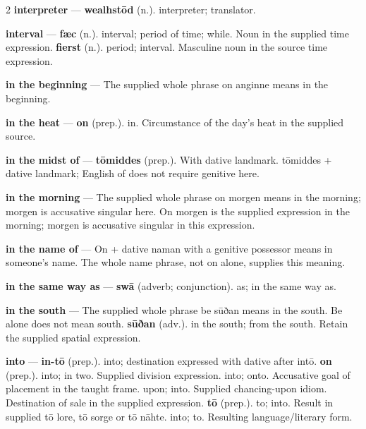 \begin{multicols}{2}
\textbf{interpreter} — \textbf{wealhstōd} (n.). interpreter; translator.\par
\textbf{interval} — \textbf{fæc} (n.). interval; period of time; while. Noun in the supplied time expression. \textbf{fierst} (n.). period; interval. Masculine noun in the source time expression.\par
\textbf{in the beginning} — The supplied whole phrase on anginne means in the beginning.\par
\textbf{in the heat} — \textbf{on} (prep.). in. Circumstance of the day's heat in the supplied source.\par
\textbf{in the midst of} — \textbf{tōmiddes} (prep.). With dative landmark. tōmiddes + dative landmark; English of does not require genitive here.\par
\textbf{in the morning} — The supplied whole phrase on morgen means in the morning; morgen is accusative singular here. On morgen is the supplied expression in the morning; morgen is accusative singular in this expression.\par
\textbf{in the name of} — On + dative naman with a genitive possessor means in someone’s name. The whole name phrase, not on alone, supplies this meaning.\par
\textbf{in the same way as} — \textbf{swā} (adverb; conjunction). as; in the same way as.\par
\textbf{in the south} — The supplied whole phrase be sūðan means in the south. Be alone does not mean south. \textbf{sūðan} (adv.). in the south; from the south. Retain the supplied spatial expression.\par
\textbf{into} — \textbf{in-tō} (prep.). into; destination expressed with dative after intō. \textbf{on} (prep.). into; in two. Supplied division expression. into; onto. Accusative goal of placement in the taught frame. upon; into. Supplied chancing-upon idiom. Destination of sale in the supplied expression. \textbf{tō} (prep.). to; into. Result in supplied tō lore, tō sorge or tō nāhte. into; to. Resulting language/literary form.\par

\end{multicols}

